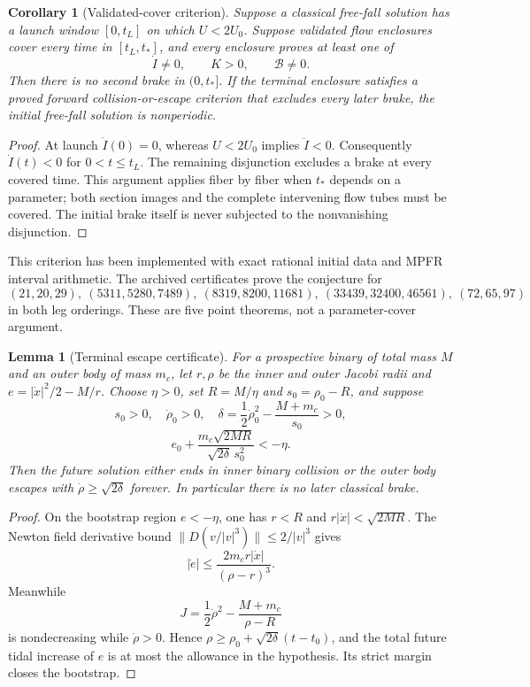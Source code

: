\documentclass[11pt]{article}
\newtheorem{lemma}[theorem]{Lemma}
\newtheorem{corollary}[theorem]{Corollary}
\newcommand{\Bcal}{\mathcal B}
\begin{document}
\begin{corollary}[Validated-cover criterion]\label{cor:cover}
Suppose a classical free-fall solution has a launch window $[0,t_L]$ on
which $U<2U_0$. Suppose validated flow enclosures cover every time in
$[t_L,t_*]$, and every enclosure proves at least one of
\[
 \dot I\ne0,\qquad K>0,\qquad \Bcal\ne0.
\]
Then there is no second brake in $(0,t_*]$. If the terminal enclosure
satisfies a proved forward collision-or-escape criterion that excludes every
later brake, the initial free-fall solution is nonperiodic.
\end{corollary}
\begin{proof}
At launch $\dot I(0)=0$, whereas $U<2U_0$ implies $\ddot I<0$.
Consequently $\dot I(t)<0$ for $0<t\le t_L$. The remaining disjunction
excludes a brake at every covered time. This argument applies fiber by fiber
when $t_*$ depends on a parameter; both section images and the complete
intervening flow tubes must be covered. The initial brake itself is never
subjected to the nonvanishing disjunction.
\end{proof}

This criterion has been implemented with exact rational initial data and
MPFR interval arithmetic.  The archived certificates prove the conjecture
for
\[
(21,20,29),\ (5311,5280,7489),\ (8319,8200,11681),
\ (33439,32400,46561),\ (72,65,97)
\]
in both leg orderings.  These are five point theorems, not a parameter-cover
argument.

\begin{lemma}[Terminal escape certificate]\label{lem:escape}
For a prospective binary of total mass $M$ and an outer body of mass $m_c$,
let $r,\rho$ be the inner and outer Jacobi radii and
$e=|\dot x|^2/2-M/r$. Choose $\eta>0$, set $R=M/\eta$ and
$s_0=\rho_0-R$, and suppose
\[
s_0>0,\quad \dot\rho_0>0,\quad
\delta=\frac12\dot\rho_0^2-\frac{M+m_c}{s_0}>0,
\]
\[
e_0+\frac{m_c\sqrt{2MR}}
{\sqrt{2\delta}\,s_0^2}<-\eta.
\]
Then the future solution either ends in inner binary collision or the outer
body escapes with $\dot\rho\ge\sqrt{2\delta}$ forever. In particular there is
no later classical brake.
\end{lemma}
\begin{proof}
On the bootstrap region $e<-\eta$, one has
$r<R$ and $r|\dot x|<\sqrt{2MR}$. The Newton field derivative bound
$\|D(v/|v|^3)\|\le2/|v|^3$ gives
\[
|\dot e|\le\frac{2m_cr|\dot x|}{(\rho-r)^3}.
\]
Meanwhile
\[
J=\frac12\dot\rho^2-\frac{M+m_c}{\rho-R}
\]
is nondecreasing while $\dot\rho>0$. Hence
$\rho\ge\rho_0+\sqrt{2\delta}(t-t_0)$, and the total future tidal increase of
$e$ is at most the allowance in the hypothesis. Its strict margin closes the
bootstrap.
\end{proof}
\end{document}
